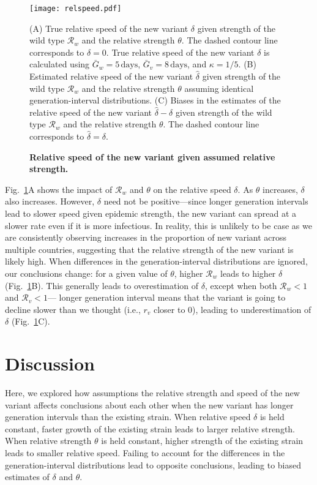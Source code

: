 \documentclass[12pt]{article}
\newcommand{\fref}[1]{Fig.~\ref{fig:#1}}
\newcommand{\RR}{\ensuremath{{\mathcal R}}\xspace}
\begin{document}
\begin{figure}[!th]
\texttt{[image: relspeed.pdf]}
\caption{
\textbf{Relative speed of the new variant given assumed relative strength.}
}
(A) True relative speed of the new variant $\delta$ given strength of the wild type $\RR_w$ and the relative strength $\theta$.
The dashed contour line corresponds to $\delta = 0$.
True relative speed of the new variant $\delta$ is calculated using $\bar{G}_w = 5\,\textrm{days}$, $\bar{G}_v = 8\,\textrm{days}$, and $\kappa = 1/5$. 
(B) Estimated relative speed of the new variant $\hat{\delta}$ given strength of the wild type $\RR_w$ and the relative strength $\theta$ assuming identical generation-interval distributions.
(C) Biases in the estimates of the relative speed of the new variant $\hat{\delta} - \delta$ given strength of the wild type $\RR_w$ and the relative strength $\theta$.
The dashed contour line corresponds to $\hat{\delta} = \delta$.
\label{fig:relspeed}
\end{figure}

\fref{relspeed}A shows the impact of $\RR_w$ and $\theta$ on the relative speed $\delta$.
As $\theta$ increases, $\delta$ also increases.
However, $\delta$ need not be positive---since longer generation intervals lead to slower speed given epidemic strength, the new variant can spread at a slower rate even if it is more infectious.
In reality, this is unlikely to be case as we are consistently observing increases in the proportion of new variant across multiple countries, suggesting that the relative strength of the new variant is likely high.
When differences in the generation-interval distributions are ignored, our conclusions change: for a given value of $\theta$, higher $\RR_w$ leads to higher $\delta$ (\fref{relspeed}B).
This generally leads to overestimation of $\delta$, except when both $\RR_w < 1$ and $\RR_v < 1$---
longer generation interval means that the variant is going to decline slower than we thought (i.e., $r_v$ closer to 0), leading to underestimation of $\delta$ (\fref{relspeed}C).

\section{Discussion}

Here, we explored how assumptions the relative strength and speed of the new variant affects conclusions about each other when the new variant has longer generation intervals than the existing strain.
When relative speed $\delta$ is held constant, faster growth of the existing strain leads to larger relative strength.
When relative strength $\theta$ is held constant, higher strength of the existing strain leads to smaller relative speed.
Failing to account for the differences in the generation-interval distributions lead to opposite conclusions, leading to biased estimates of $\delta$ and $\theta$.
\end{document}
